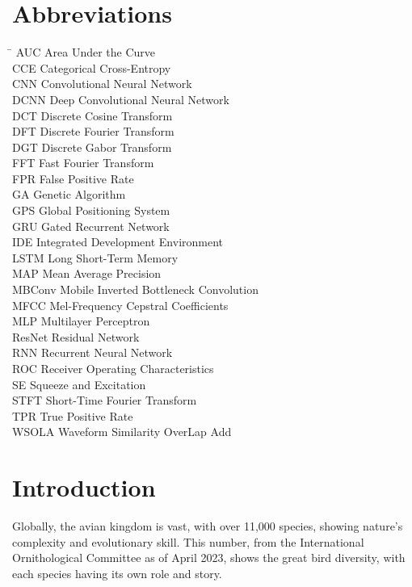\chapter*{Abbreviations}
\begin{tabbing}
    \hspace{50mm}\=\kill
    AUC \> Area Under the Curve \\
    CCE \> Categorical Cross-Entropy \\
    CNN \> Convolutional Neural Network\\
    DCNN \> Deep Convolutional Neural Network\\
    DCT \> Discrete Cosine Transform\\
    DFT \> Discrete Fourier Transform\\
    DGT \> Discrete Gabor Transform\\
    FFT \> Fast Fourier Transform \\
    FPR \> False Positive Rate \\
    GA \> Genetic Algorithm\\ 
    GPS \> Global Positioning System\\
    GRU \> Gated Recurrent Network\\
    IDE \> Integrated Development Environment \\
    LSTM \> Long Short-Term Memory\\
    MAP \> Mean Average Precision\\
    MBConv \> Mobile Inverted Bottleneck Convolution\\
    MFCC \> Mel-Frequency Cepstral Coefficients\\
    MLP \> Multilayer Perceptron\\ 
    ResNet \> Residual Network\\
    RNN \> Recurrent Neural Network\\
    ROC \> Receiver Operating Characteristics\\ 
    SE \> Squeeze and Excitation \\
    STFT \> Short-Time Fourier Transform\\
    TPR \> True Positive Rate \\
    WSOLA \> Waveform Similarity OverLap Add\\
    
\end{tabbing}


\newpage
{}

\chapter{Introduction}\label{sec}
Globally, the avian kingdom is vast, with over 11,000 species, showing nature's
complexity and evolutionary skill. This number, from the International
Ornithological Committee as of April 2023, shows the great bird diversity, with
each species having its own role and story.\cite{ioc_updates}

